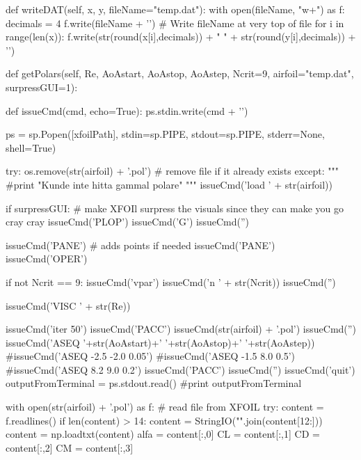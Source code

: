 \begin{pythoncode}
    def writeDAT(self, x, y, fileName="temp.dat"):
        with open(fileName, "w+") as f:
            decimals = 4
            f.write(fileName + '\n') # Write fileName at very top of file
            for i in range(len(x)):
                f.write(str(round(x[i],decimals)) + "     " + str(round(y[i],decimals)) + '\n')

    def getPolars(self, Re, AoAstart, AoAstop, AoAstep, Ncrit=9, airfoil="temp.dat", surpressGUI=1):

        def issueCmd(cmd, echo=True):
            ps.stdin.write(cmd + '\n')

        ps = sp.Popen([xfoilPath], 
            stdin=sp.PIPE, 
            stdout=sp.PIPE,
            stderr=None,
            shell=True)

        try:
            os.remove(str(airfoil) + '.pol') # remove file if it already exists
        except:
            """
            #print "Kunde inte hitta gammal polare"
            """
        issueCmd('load ' + str(airfoil))
 
        if surpressGUI: # make XFOIl surpress the visuals since they can make you go cray cray
            issueCmd('PLOP')
            issueCmd('G')
            issueCmd('')

        issueCmd('PANE') # adds points if needed
        issueCmd('PANE')
        issueCmd('OPER')

        if not Ncrit == 9:
            issueCmd('vpar')
            issueCmd('n ' + str(Ncrit))
            issueCmd('')

        issueCmd('VISC ' + str(Re))

        issueCmd('iter 50')
        issueCmd('PACC')
        issueCmd(str(airfoil) + '.pol')
        issueCmd('')
        issueCmd('ASEQ '+str(AoAstart)+' '+str(AoAstop)+' '+str(AoAstep))
        #issueCmd('ASEQ -2.5 -2.0 0.05')
        #issueCmd('ASEQ -1.5  8.0 0.5')
        #issueCmd('ASEQ  8.2  9.0 0.2')
        issueCmd('PACC')
        issueCmd('')
        issueCmd('quit')
        outputFromTerminal = ps.stdout.read()
        #print outputFromTerminal

        with open(str(airfoil) + '.pol') as f: # read file from XFOIL
            try:
                content = f.readlines()
                if len(content) > 14:
                    content = StringIO("\n".join(content[12:]))
                    content = np.loadtxt(content)
                    alfa = content[:,0]
                    CL = content[:,1]
                    CD = content[:,2]
                    CM = content[:,3]


\end{pythoncode}
